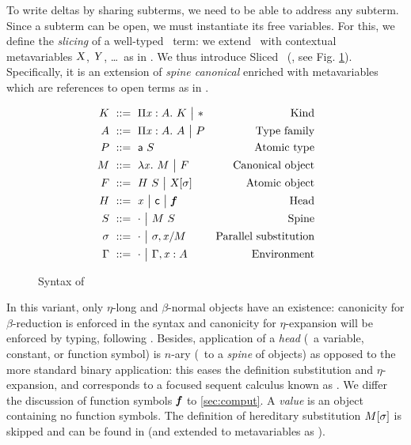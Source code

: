 \documentclass{llncs}
\begin{document}
To write deltas by sharing subterms, we need to be able to address any
subterm. Since a subterm can be open, we must instantiate its free
variables. For this, we define the \emph{slicing} of a well-typed \LF\
term: we extend \LF\ with contextual metavariables $\text{\textsl{X}}$, $\text{\textsl{Y}}$, \ldots\ as in \cite{nanevski2008contextual}. We thus introduce
Sliced \LF\ (\SLF, see Fig. \ref{fig:syntax-LF}). Specifically, it is
an extension of \emph{spine canonical \LF} \cite{pfenning2007term}
enriched with metavariables which are references to open terms as in
\cite{nanevski2008contextual}.

\begin{figure}[t]
  \begin{align*}
    K &\ ::=\  \Pi{\ensuremath{\text{\textit{x}}}}:{A}.\  K \ {\big|}\  \mathsf{*} &
    \text{Kind}\\
    A &\ ::=\  \Pi{\ensuremath{\text{\textit{x}}}}:{A}.\  A \ {\big|}\  P &
    \text{Type family} \\
    P &\ ::=\  {\text{\textsf{a}}}\  S &
    \text{Atomic type} \\
    M &\ ::=\  \lambda{\ensuremath{\text{\textit{x}}}}.\  M \ {\big|}\  F &
    \text{Canonical object} \\
    F &\ ::=\  {H}\  S \ {\big|}\  {\text{\textsl{X}}}[{\sigma}] &
    \text{Atomic object} \\
    H &\ ::=\  \text{\textit{x}} \ {\big|}\  \text{\textsf{c}} \ {\big|}\  \text{\textit{\textbf{f}}} &
    \text{Head}\\
    S &\ ::=\  \cdot \ {\big|}\  {M}\ {S} &
    \text{Spine}\\
    \sigma &\ ::=\  \cdot \ {\big|}\  {\sigma},{{\text{\textit{x}}}/{M}} &
    \text{Parallel substitution} \\
    \Gamma &\ ::=\  \cdot \ {\big|}\  {\Gamma},{{\text{\textit{x}}}:{A}} &
    \text{Environment}
  \end{align*}
  \caption{Syntax of \SLF}
  \label{fig:syntax-LF}
\end{figure}

In this variant, only $\eta$-long and $\beta$-normal objects have an
existence: canonicity for $\beta$-reduction is enforced in the syntax
and canonicity for $\eta$-expansion will be enforced by typing,
following \cite{hl07mechanizing}. Besides, application of a
\emph{head} (\ie\ a variable, constant, or function symbol) is $n$-ary
(\ie\ to a \emph{spine} of objects) as opposed to the more standard
binary application: this eases the definition substitution and
$\eta$-expansion, and corresponds to a focused sequent calculus known
as \sysname{LJT} \cite{herbelin1995lambda}. We differ the discussion of
function symbols $\text{\textit{\textbf{f}}}$ to \ref{sec:comput}. A \emph{value} is an
object containing no function symbols. The definition of hereditary
substitution ${M}[{\sigma}]$ is skipped and can be found in
\cite{pfenning2007term} (and extended to metavariables as
\cite{nanevski2008contextual}).
\end{document}
